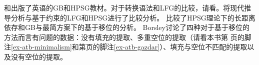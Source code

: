 \citet{Borsley99a-u}和\citet{KS2008a-u}出版了英语的GB和HPSG教材。对于转换语法和LFG的比较，请看。将现代推导分析与基于约束的LFG和HPSG进行了比较分析。\citet{Borsley2012a} 比较了HPSG理论下的长距离依存和GB与最简方案下的基于移位的分析。 Borsley讨论了四种对于基于移位的方法而言有问题的数据：没有填充的提取、多重空位的提取（请看本书第\pageref{ex-atb-minimalism} 页的脚注\ref{ex-atb-minimalism}和第\pageref{ex-atb-gazdar}页的脚注\ref{ex-atb-gazdar}）、填充与空位不匹配的提取以及没有空位的提取。
















